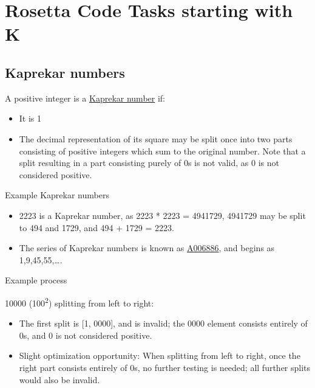 %
%
%

\chapter{Rosetta Code Tasks starting with K}

\section*{Kaprekar numbers}

A positive integer is a
\href{http://en.wikipedia.org/wiki/Kaprekar\_number}{Kaprekar number}
if:

\begin{itemize}
\item
  It is 1
\item
  The decimal representation of its square may be split once into two
  parts consisting of positive integers which sum to the original
  number. Note that a split resulting in a part consisting purely of 0s
  is not valid, as 0 is not considered positive.
\end{itemize}

\begin{description}
\item[Example Kaprekar numbers]
\end{description}

\begin{itemize}
\item
  2223 is a Kaprekar number, as 2223 * 2223 = 4941729, 4941729 may be
  split to 494 and 1729, and 494 + 1729 = 2223.
\item
  The series of Kaprekar numbers is known as
  \href{http://oeis.org/A006886}{A006886}, and begins as
  1,9,45,55,\ldots{}.
\end{itemize}

\begin{description}
\item[Example process]
\end{description}

10000 (100\textsuperscript{2}) splitting from left to right:

\begin{itemize}
\item
  The first split is {[}1, 0000{]}, and is invalid; the 0000 element
  consists entirely of 0s, and 0 is not considered positive.
\item
  Slight optimization opportunity: When splitting from left to right,
  once the right part consists entirely of 0s, no further testing is
  needed; all further splits would also be invalid.
\end{itemize}


